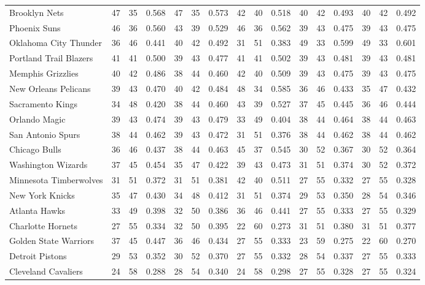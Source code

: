 \documentclass[11pt,a4paper]{article}
\begin{document}
\begin{table}[H]
\begin{tabular}{l ccc ccc ccc ccc ccc}
Brooklyn Nets & 47 & 35 & 0.568 & 47 & 35 & 0.573 & 42 & 40 & 0.518 & 40 & 42 & 0.493 & 40 & 42 & 0.492 \\
Phoenix Suns & 46 & 36 & 0.560 & 43 & 39 & 0.529 & 46 & 36 & 0.562 & 39 & 43 & 0.475 & 39 & 43 & 0.475 \\
Oklahoma City Thunder & 36 & 46 & 0.441 & 40 & 42 & 0.492 & 31 & 51 & 0.383 & 49 & 33 & 0.599 & 49 & 33 & 0.601 \\
Portland Trail Blazers & 41 & 41 & 0.500 & 39 & 43 & 0.477 & 41 & 41 & 0.502 & 39 & 43 & 0.481 & 39 & 43 & 0.481 \\
Memphis Grizzlies & 40 & 42 & 0.486 & 38 & 44 & 0.460 & 42 & 40 & 0.509 & 39 & 43 & 0.475 & 39 & 43 & 0.475 \\
New Orleans Pelicans & 39 & 43 & 0.470 & 40 & 42 & 0.484 & 48 & 34 & 0.585 & 36 & 46 & 0.433 & 35 & 47 & 0.432 \\
Sacramento Kings & 34 & 48 & 0.420 & 38 & 44 & 0.460 & 43 & 39 & 0.527 & 37 & 45 & 0.445 & 36 & 46 & 0.444 \\
Orlando Magic & 39 & 43 & 0.474 & 39 & 43 & 0.479 & 33 & 49 & 0.404 & 38 & 44 & 0.464 & 38 & 44 & 0.463 \\
San Antonio Spurs & 38 & 44 & 0.462 & 39 & 43 & 0.472 & 31 & 51 & 0.376 & 38 & 44 & 0.462 & 38 & 44 & 0.462 \\
Chicago Bulls & 36 & 46 & 0.437 & 38 & 44 & 0.463 & 45 & 37 & 0.545 & 30 & 52 & 0.367 & 30 & 52 & 0.364 \\
Washington Wizards & 37 & 45 & 0.454 & 35 & 47 & 0.422 & 39 & 43 & 0.473 & 31 & 51 & 0.374 & 30 & 52 & 0.372 \\
Minnesota Timberwolves & 31 & 51 & 0.372 & 31 & 51 & 0.381 & 42 & 40 & 0.511 & 27 & 55 & 0.332 & 27 & 55 & 0.328 \\
New York Knicks & 35 & 47 & 0.430 & 34 & 48 & 0.412 & 31 & 51 & 0.374 & 29 & 53 & 0.350 & 28 & 54 & 0.346 \\
Atlanta Hawks & 33 & 49 & 0.398 & 32 & 50 & 0.386 & 36 & 46 & 0.441 & 27 & 55 & 0.333 & 27 & 55 & 0.329 \\
Charlotte Hornets & 27 & 55 & 0.334 & 32 & 50 & 0.395 & 22 & 60 & 0.273 & 31 & 51 & 0.380 & 31 & 51 & 0.377 \\
Golden State Warriors & 37 & 45 & 0.447 & 36 & 46 & 0.434 & 27 & 55 & 0.333 & 23 & 59 & 0.275 & 22 & 60 & 0.270 \\
Detroit Pistons & 29 & 53 & 0.352 & 30 & 52 & 0.370 & 27 & 55 & 0.332 & 28 & 54 & 0.337 & 27 & 55 & 0.333 \\
Cleveland Cavaliers & 24 & 58 & 0.288 & 28 & 54 & 0.340 & 24 & 58 & 0.298 & 27 & 55 & 0.328 & 27 & 55 & 0.324 \\
\bottomrule
\end{tabular}
\end{table}
\end{document}
